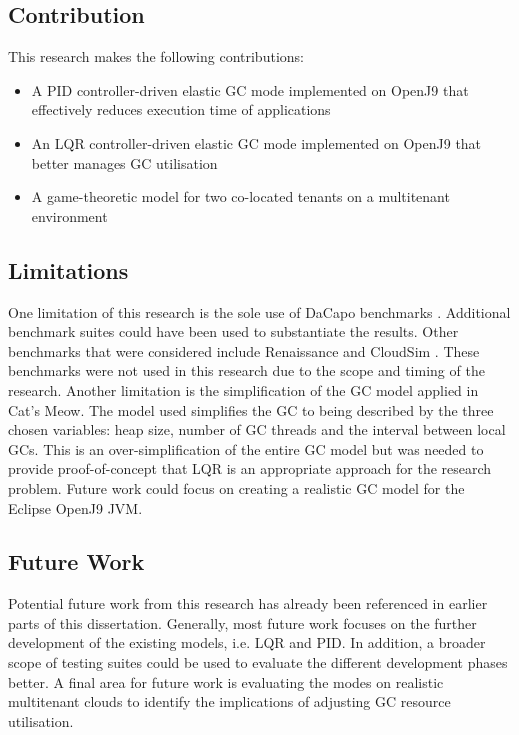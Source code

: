 \subsection{Contribution}

This research makes the following contributions:

\begin{itemize}
\item
  A PID controller-driven elastic GC mode implemented on OpenJ9 that effectively reduces execution time of applications
\item
  An LQR controller-driven elastic GC mode implemented on OpenJ9 that better manages GC utilisation
\item
  A game-theoretic model for two co-located tenants on a multitenant
  environment
\end{itemize}

\subsection{Limitations}
One limitation of this research is the sole use of DaCapo benchmarks
\cite{blackburn2006dacapo}. Additional benchmark suites could
have been used to substantiate the results. Other benchmarks that were
considered include Renaissance \cite{prokopec2019renaissance} and
CloudSim \cite{calheiros2011virtual}. These benchmarks were not
used in this research due to the scope and timing of the research.
\newline\newline
Another limitation is the simplification of the GC model applied in
Cat's Meow. The model used simplifies the GC to being described by the
three chosen variables: heap size, number of GC threads and the interval
between local GCs. This is an over-simplification of the entire GC model
but was needed to provide proof-of-concept that LQR is an appropriate
approach for the research problem. Future work could focus on creating a
realistic GC model for the Eclipse OpenJ9 JVM.

\subsection{Future Work}
Potential future work from this research has already been referenced in
earlier parts of this dissertation. Generally, most future work focuses
on the further development of the existing models, i.e. LQR and PID. In
addition, a broader scope of testing suites could be used to evaluate
the different development phases better. A final area for future work is
evaluating the modes on realistic multitenant clouds to identify the
implications of adjusting GC resource utilisation.
